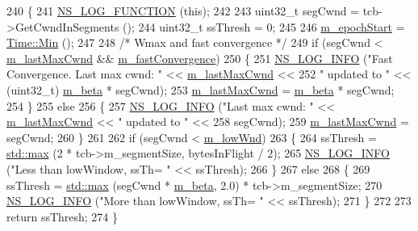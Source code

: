 \begin{DoxyCode}
240 \{
241   \hyperlink{log-macros-disabled_8h_a90b90d5bad1f39cb1b64923ea94c0761}{NS\_LOG\_FUNCTION} (\textcolor{keyword}{this});
242 
243   uint32\_t segCwnd = tcb->GetCwndInSegments ();
244   uint32\_t ssThresh = 0;
245 
246   \hyperlink{classns3_1_1TcpBic_ae0f10aaccd31702d06dc3fb76450ac38}{m\_epochStart} = \hyperlink{classns3_1_1Time_a75169ee37c557c616eb79e1a15ed09b7}{Time::Min} ();
247 
248   \textcolor{comment}{/* Wmax and fast convergence */}
249   \textcolor{keywordflow}{if} (segCwnd < \hyperlink{classns3_1_1TcpBic_a082025c05e83dcddab77a6e3209cd4eb}{m\_lastMaxCwnd} && \hyperlink{classns3_1_1TcpBic_a034d8e16b688a2c58b5d2213aa5c3b7b}{m\_fastConvergence})
250     \{
251       \hyperlink{group__logging_gafbd73ee2cf9f26b319f49086d8e860fb}{NS\_LOG\_INFO} (\textcolor{stringliteral}{"Fast Convergence. Last max cwnd: "} << 
      \hyperlink{classns3_1_1TcpBic_a082025c05e83dcddab77a6e3209cd4eb}{m\_lastMaxCwnd} <<
252                    \textcolor{stringliteral}{" updated to "} << (uint32\_t) \hyperlink{classns3_1_1TcpBic_a899269934e13c92129fec020cc09256e}{m\_beta} * segCwnd);
253       \hyperlink{classns3_1_1TcpBic_a082025c05e83dcddab77a6e3209cd4eb}{m\_lastMaxCwnd} = \hyperlink{classns3_1_1TcpBic_a899269934e13c92129fec020cc09256e}{m\_beta} * segCwnd;
254     \}
255   \textcolor{keywordflow}{else}
256     \{
257       \hyperlink{group__logging_gafbd73ee2cf9f26b319f49086d8e860fb}{NS\_LOG\_INFO} (\textcolor{stringliteral}{"Last max cwnd: "} << \hyperlink{classns3_1_1TcpBic_a082025c05e83dcddab77a6e3209cd4eb}{m\_lastMaxCwnd} << \textcolor{stringliteral}{" updated to "} <<
258                    segCwnd);
259       \hyperlink{classns3_1_1TcpBic_a082025c05e83dcddab77a6e3209cd4eb}{m\_lastMaxCwnd} = segCwnd;
260     \}
261 
262   \textcolor{keywordflow}{if} (segCwnd < \hyperlink{classns3_1_1TcpBic_a1a7a6a7c186075fba672ff3328eb85ec}{m\_lowWnd})
263     \{
264       ssThresh = \hyperlink{80211b_8c_affe776513b24d84b39af8ab0930fef7f}{std::max} (2 * tcb->m\_segmentSize, bytesInFlight / 2);
265       \hyperlink{group__logging_gafbd73ee2cf9f26b319f49086d8e860fb}{NS\_LOG\_INFO} (\textcolor{stringliteral}{"Less than lowWindow, ssTh= "} << ssThresh);
266     \}
267   \textcolor{keywordflow}{else}
268     \{
269       ssThresh = \hyperlink{80211b_8c_affe776513b24d84b39af8ab0930fef7f}{std::max} (segCwnd * \hyperlink{classns3_1_1TcpBic_a899269934e13c92129fec020cc09256e}{m\_beta}, 2.0) * tcb->m\_segmentSize;
270       \hyperlink{group__logging_gafbd73ee2cf9f26b319f49086d8e860fb}{NS\_LOG\_INFO} (\textcolor{stringliteral}{"More than lowWindow, ssTh= "} << ssThresh);
271     \}
272 
273   \textcolor{keywordflow}{return} ssThresh;
274 \}
\end{DoxyCode}


